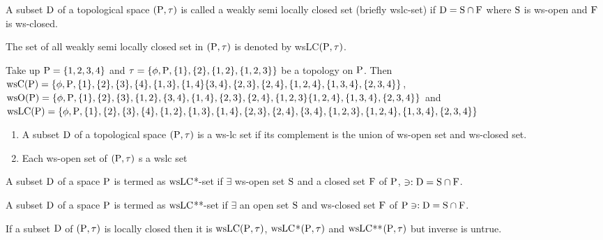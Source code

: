 \begin{dfn}\label{defi6.2.1}
A subset $\mathrm{D}$ of a topological space $(\mathrm{P}, \tau)$ is called a weakly semi locally closed set (briefly wslc-set) if $\mathrm{D} = \mathrm{S} \cap \mathrm{F}$ where $\mathrm{S}$ is ws-open and $\mathrm{F}$ is ws-closed.
\end{dfn}

The set of all weakly semi locally closed set in $(\mathrm{P},\tau)$ is denoted by wsLC$(\mathrm{P}, \tau)$.

\begin{exm}\label{exam6.2.2}
Take up $\mathrm{P} = \{1,2,3,4\}$ and $\tau = \{\phi,\mathrm{P}, \{1\}, \{2\}, \{1,2\},\{1,2,3\}\}$ be a topology on $\mathrm{P}$. Then $\ws\TSC(\TSP) = \{\phi, \TSP,\{1\}, \{2\}, \{3\}, \{4\}, \{1,3\}, \{1,4\} \{3,4\}, \{2,3\},\break \{2,4\}, \{1,2,4\},\{1,3,4\},\{2,3,4\}\}$, $\ws\TSO(\TSP) = \{\phi, \TSP, \{1\}, \{2\}, \{3\},\{1,2\}, \{3,4\}, \{1,4\},\break \{2,3\}, \{2,4\}, \{1,2,3\}\{1,2,4\},\{1,3,4\},\{2,3,4\}\}$ and $\ws\LC(\TSP)=\{\phi,\TSP,\{1\},\{2\},\{3\},\break \{4\},\{1,2\},\{1,3\},\{1,4\},\{2,3\},\{2,4\},\{3,4\},\{1,2,3\},\{1,2,4\},\{1,3,4\},\{2,3,4\}\}$
\end{exm}

\begin{rem}\label{rem6.2.3}
\begin{enumerate}[(1)]
\item A subset $\mathrm{D}$ of a topological space $(\mathrm{P}, \tau)$ is a ws-lc set if its complement is the union of ws-open set and ws-closed set.
\item Each ws-open set of $(\mathrm{P}, \tau)$ s a wslc set
\end{enumerate}
\end{rem}

\begin{dfn}\label{defi6.2.4}
A subset $\mathrm{D}$ of a space $\mathrm{P}$ is termed as $\mathrm{ws}\mathrm{LC}$*-set if $\exists$ ws-open set $\mathrm{S}$ and a closed set $\mathrm{F}$ of $\mathrm{P}$, $\ni: \mathrm{D} = \mathrm{S} \cap \mathrm{F}$.
\end{dfn}

\begin{dfn}\label{defi6.2.5}
A subset $\mathrm{D}$ of a space $\mathrm{P}$ is termed as $\mathrm{ws}\mathrm{LC}${*}{*}-set if $\exists$ an open set $\mathrm{S}$ and ws-closed set $\mathrm{F}$ of $\mathrm{P} \ni: \mathrm{D} = \mathrm{S}\cap \mathrm{F}$.
\end{dfn}

\begin{thm}\label{thm6.2.6}
If a subset $\mathrm{D}$ of $(\mathrm{P}, \tau)$ is locally closed then it is $\mathrm{ws}\mathrm{LC}(\mathrm{P}, \tau)$, $\mathrm{ws}\mathrm{LC}$*$(\mathrm{P}, \tau)$ and $\mathrm{ws}\mathrm{LC}${*}{*}$(\mathrm{P}, \tau)$ but inverse is untrue.
\end{thm}

